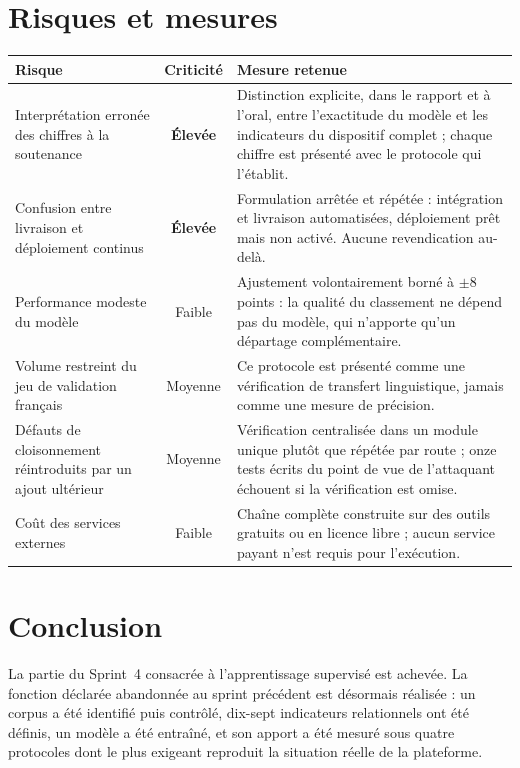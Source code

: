 \documentclass[11pt,a4paper]{article}
\begin{document}
\section{Risques et mesures}

\begin{center}
\small
\begin{tabular}{p{4.4cm}cp{7.6cm}}
  \toprule
  \textbf{Risque} & \textbf{Criticité} & \textbf{Mesure retenue} \\
  \midrule
  Interprétation erronée des chiffres à la soutenance & \textcolor{ambre}{\textbf{Élevée}} & Distinction explicite, dans le rapport et à l'oral, entre l'exactitude du modèle et les indicateurs du dispositif complet ; chaque chiffre est présenté avec le protocole qui l'établit. \\[1mm]
  Confusion entre livraison et déploiement continus & \textcolor{ambre}{\textbf{Élevée}} & Formulation arrêtée et répétée : intégration et livraison automatisées, déploiement prêt mais non activé. Aucune revendication au-delà. \\[1mm]
  Performance modeste du modèle & Faible & Ajustement volontairement borné à $\pm$8 points : la qualité du classement ne dépend pas du modèle, qui n'apporte qu'un départage complémentaire. \\[1mm]
  Volume restreint du jeu de validation français & Moyenne & Ce protocole est présenté comme une vérification de transfert linguistique, jamais comme une mesure de précision. \\[1mm]
  Défauts de cloisonnement réintroduits par un ajout ultérieur & Moyenne & Vérification centralisée dans un module unique plutôt que répétée par route ; onze tests écrits du point de vue de l'attaquant échouent si la vérification est omise. \\[1mm]
  Coût des services externes & Faible & Chaîne complète construite sur des outils gratuits ou en licence libre ; aucun service payant n'est requis pour l'exécution. \\
  \bottomrule
\end{tabular}
\end{center}

\section{Conclusion}
La partie du Sprint~4 consacrée à l'apprentissage supervisé est achevée. La fonction déclarée abandonnée au sprint précédent est désormais réalisée : un corpus a été identifié puis contrôlé, dix-sept indicateurs relationnels ont été définis, un modèle a été entraîné, et son apport a été mesuré sous quatre protocoles dont le plus exigeant reproduit la situation réelle de la plateforme.
\end{document}
